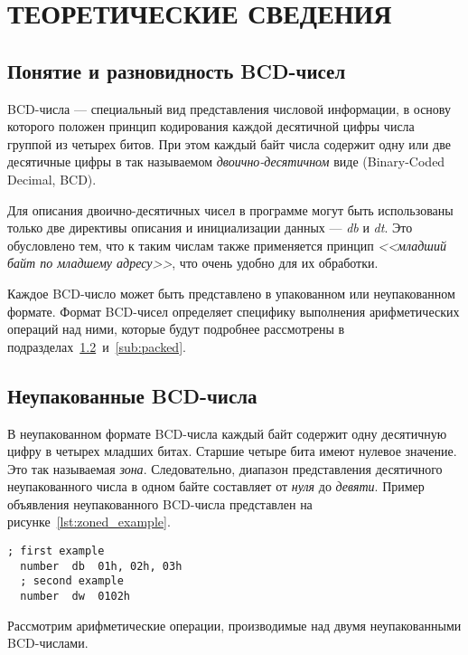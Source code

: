 \section{ТЕОРЕТИЧЕСКИЕ СВЕДЕНИЯ}

\subsection{Понятие и разновидность BCD-чисел}

BCD-числа --- специальный вид представления числовой информации, в основу которого
положен принцип кодирования каждой десятичной цифры числа группой из четырех битов.
При этом каждый байт числа содержит одну или две десятичные цифры в так называемом
\textit{двоично-десятичном} виде (Binary-Coded Decimal, BCD).

Для описания двоично-десятичных чисел в программе могут быть использованы только
две директивы описания и инициализации данных --- \textit{db} и \textit{dt}.
Это обусловлено тем, что к таким числам также применяется принцип
\textit{<<младший байт по младшему адресу>>}, что очень удобно для их обработки.

Каждое BCD-число может быть представлено в упакованном или неупакованном формате.
Формат BCD-чисел определяет специфику выполнения арифметических операций над ними,
которые будут подробнее рассмотрены в подразделах~\ref{sub:zoned}~и~\ref{sub:packed}.


\subsection{Неупакованные BCD-числа}
\label{sub:zoned}

В неупакованном формате BCD-числа каждый байт содержит одну десятичную цифру в
четырех младших битах. Старшие четыре бита имеют нулевое значение. Это так называемая
\textit{зона}. Следовательно, диапазон представления десятичного неупакованного
числа в одном байте составляет от \textit{нуля} до \textit{девяти}. Пример объявления
неупакованного BCD-числа представлен на рисунке~\ref{lst:zoned_example}.

\begin{lstlisting}[caption=Пример объявления неупакованного BCD-числа,label=lst:zoned_example,
language={[x86masm]Assembler},basicstyle=\scriptsize\ttfamily]
  ; first example
  number  db  01h, 02h, 03h
  ; second example
  number  dw  0102h
\end{lstlisting}

Рассмотрим арифметические операции, производимые над двумя неупакованными BCD-числами.

